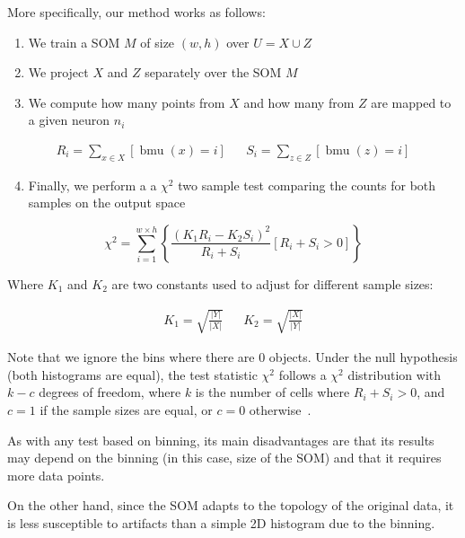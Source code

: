 More specifically, our method works as follows:

\begin{enumerate}
    \item We train a \gls{SOM} $M$ of size $(w, h)$ over $U = X \cup Z$
    \item We project $X$ and $Z$ separately over the \gls{SOM}  $M$
    \item We compute how many points from $X$ and how many from $Z$ are mapped to a given neuron $n_i$
\end{enumerate}

\begin{align}
    R_i = \sum_{x \in X} [ \operatorname{bmu}(x) = i ] && S_i = \sum_{z \in Z} [ \operatorname{bmu}(z) = i ]
\end{align}

\begin{enumerate}
    \setcounter{enumi}{3}
    \item Finally, we perform a a $\chi^2$ two sample test comparing the counts for both samples
    on the output space
\end{enumerate}

\begin{equation}
    \label{eq:chi2}
    \chi^2 = \sum_{i=1}^{w \times h}{ \left\{ \frac{(K_1 R_i - K_2 S_i)^2}{R_i + S_i} [ R_i + S_i > 0 ] \right\}}
\end{equation}

Where $K_1$ and $K_2$ are two constants used to adjust for different sample sizes:

\begin{align}
    \label{eq:k1k2} K_1 = \sqrt{\frac{|Y|}{|X|}} && K_2 = \sqrt{\frac{|X|}{|Y|}}
\end{align}

Note that we ignore the bins where there are 0 objects. Under the null hypothesis
(both histograms are equal), the test statistic $\chi^2$ follows a $\chi^2$
distribution with $k - c$ degrees of freedom, where $k$ is the number of cells
where ${R_i + S_i > 0}$, and $c = 1$ if the sample sizes are equal, or $c = 0$
otherwise~\cite{press1993numerical}.

As with any test based on binning, its main disadvantages are that its results may
depend on the binning (in this case, size of the \gls{SOM}) and that it requires
more data points.

On the other hand, since the \gls{SOM} adapts to the topology of the
original data, it is less susceptible to artifacts than a simple 2D histogram
due to the binning.

